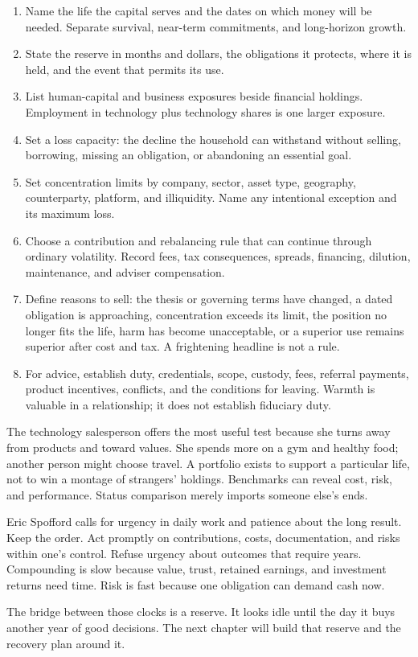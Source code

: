 \begin{enumerate}[itemsep=0.13em]
\item Name the life the capital serves and the dates on which money will be
  needed. Separate survival, near-term commitments, and long-horizon growth.
\item State the reserve in months and dollars, the obligations it protects,
  where it is held, and the event that permits its use.
\item List human-capital and business exposures beside financial holdings.
  Employment in technology plus technology shares is one larger exposure.
\item Set a loss capacity: the decline the household can withstand without
  selling, borrowing, missing an obligation, or abandoning an essential goal.
\item Set concentration limits by company, sector, asset type, geography,
  counterparty, platform, and illiquidity. Name any intentional exception and
  its maximum loss.
\item Choose a contribution and rebalancing rule that can continue through
  ordinary volatility. Record fees, tax consequences, spreads, financing,
  dilution, maintenance, and adviser compensation.
\item Define reasons to sell: the thesis or governing terms have changed, a
  dated obligation is approaching, concentration exceeds its limit, the
  position no longer fits the life, harm has become unacceptable, or a
  superior use remains superior after cost and tax. A frightening headline is
  not a rule.
\item For advice, establish duty, credentials, scope, custody, fees, referral
  payments, product incentives, conflicts, and the conditions for leaving.
  Warmth is valuable in a relationship; it does not establish fiduciary duty.
\end{enumerate}

The technology salesperson offers the most useful test because she turns away
from products and toward values. She spends more on a gym and healthy food;
another person might choose travel. A portfolio exists to support a particular
life, not to win a montage of strangers' holdings. Benchmarks can reveal cost,
risk, and performance. Status comparison merely imports someone else's ends.

Eric Spofford calls for urgency in daily work and patience about the long
result. Keep the order. Act promptly on contributions, costs, documentation,
and risks within one's control. Refuse urgency about outcomes that require
years. Compounding is slow because value, trust, retained earnings, and
investment returns need time. Risk is fast because one obligation can demand
cash now.

The bridge between those clocks is a reserve. It looks idle until the day it
buys another year of good decisions. The next chapter will build that reserve
and the recovery plan around it.
